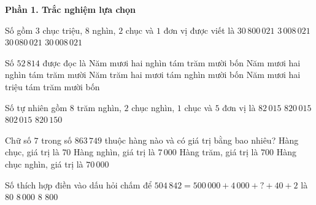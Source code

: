 \textbf{Phần 1. Trắc nghiệm lựa chọn}

\begin{ex} %
Số gồm $3$ chục triệu, $8$ nghìn, $2$ chục và $1$ đơn vị được viết là
\choice
{$30\,800\,021$}
{$3\,008\,021$}
{$30\,080\,021$}
{\True $30\,008\,021$}
\end{ex}

\begin{ex} %
Số $52\,814$ được đọc là
\choice
{\True Năm mươi hai nghìn tám trăm mười bốn}
{Năm mươi hai nghìn tám trăm mười}
{Năm trăm hai mươi tám nghìn mười bốn}
{Năm mươi hai triệu tám trăm mười bốn}
\end{ex}

\begin{ex} %
Số tự nhiên gồm $8$ trăm nghìn, $2$ chục nghìn, $1$ chục và $5$ đơn vị là
\choice
{$82\,015$}
{\True $820\,015$}
{$802\,015$}
{$820\,150$}
\end{ex}

\begin{ex} %
Chữ số $7$ trong số $863\,749$ thuộc hàng nào và có giá trị bằng bao nhiêu?
\choice
{Hàng chục, giá trị là $70$}
{Hàng nghìn, giá trị là $7\,000$}
{\True Hàng trăm, giá trị là $700$}
{Hàng chục nghìn, giá trị là $70\,000$}
\end{ex}

\begin{ex} %
Số thích hợp điền vào dấu hỏi chấm để $504\,842 = 500\,000 + 4\,000 + ? + 40 + 2$ là
\choice
{$80$}
{$8\,000$}
{$8$}
{\True $800$}
\end{ex}

